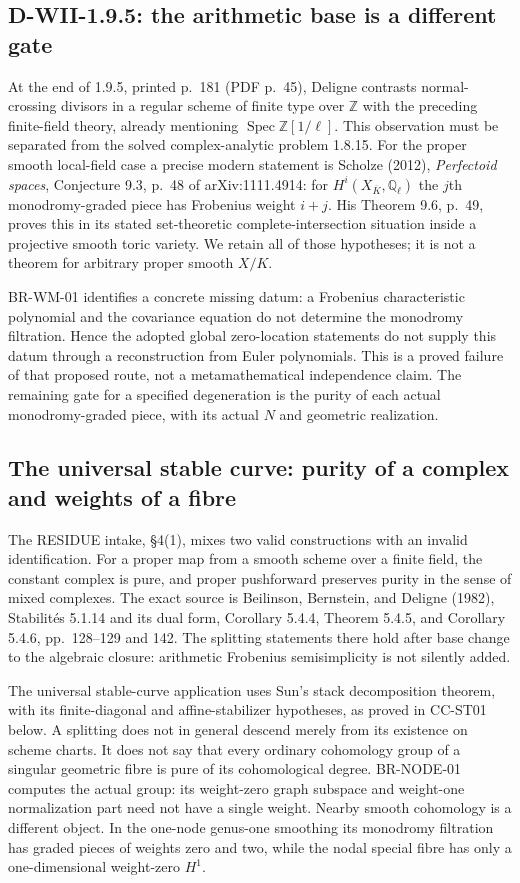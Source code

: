 \documentclass[11pt,a4paper]{article}
\theoremstyle{definition}\newtheorem{definition}[theorem]{Definition}
\theoremstyle{remark}\newtheorem{remark}[theorem]{Remark}
\begin{document}
\subsection{D-WII-1.9.5: the arithmetic base is a different gate}

At the end of 1.9.5, printed p.~181 (PDF p.~45), Deligne contrasts
normal-crossing divisors in a regular scheme of finite type over
$\mathbb Z$ with the preceding finite-field theory, already mentioning
$\operatorname{Spec}\mathbb Z[1/\ell]$. This observation must be
separated from the solved complex-analytic problem 1.8.15.
For the proper smooth local-field case a precise modern statement is
Scholze (2012), \emph{Perfectoid spaces}, Conjecture 9.3, p.~48
of arXiv:1111.4914:
for $H^i(X_{\overline K},\mathbb Q_\ell)$ the $j$th monodromy-graded
piece has Frobenius weight $i+j$. His Theorem 9.6, p.~49, proves
this in its stated set-theoretic complete-intersection situation
inside a projective smooth toric variety. We retain all of those
hypotheses; it is not a theorem for arbitrary proper smooth $X/K$.

BR-WM-01 identifies a concrete missing datum: a Frobenius
characteristic polynomial and the covariance equation do not determine
the monodromy filtration. Hence the adopted global zero-location
statements do not supply this datum through a reconstruction from
Euler polynomials. This is a proved failure of that proposed route,
not a metamathematical independence claim. The remaining gate for a
specified degeneration is the purity of each actual monodromy-graded
piece, with its actual $N$ and geometric realization.

\subsection{The universal stable curve: purity of a complex and weights of a fibre}

The RESIDUE intake, \S4(1), mixes two valid constructions with an
invalid identification. For a proper map from a smooth scheme over
a finite field, the constant complex is pure, and proper pushforward
preserves purity in the sense of mixed complexes. The exact source is
Beilinson, Bernstein, and Deligne (1982), Stabilit\'es 5.1.14 and its dual
form, Corollary 5.4.4, Theorem 5.4.5, and Corollary 5.4.6,
pp.~128--129 and 142. The splitting statements there hold after
base change to the algebraic closure: arithmetic Frobenius
semisimplicity is not silently added.

The universal stable-curve application uses Sun's stack decomposition
theorem, with its finite-diagonal and affine-stabilizer hypotheses,
as proved in CC-ST01 below. A splitting does not in general descend
merely from its existence on scheme charts. It does not say that every ordinary
cohomology group of a singular geometric fibre is pure of its
cohomological degree. BR-NODE-01 computes the actual group: its
weight-zero graph subspace and weight-one normalization part need
not have a single weight. Nearby smooth cohomology is a different
object. In the one-node genus-one smoothing its monodromy filtration
has graded pieces of weights zero and two, while the nodal special
fibre has only a one-dimensional weight-zero $H^1$.
\end{document}
